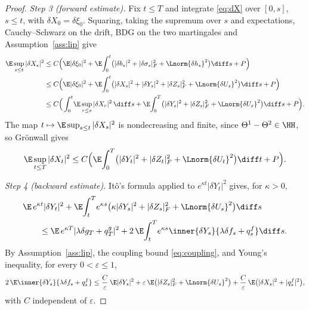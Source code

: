 \begin{proof}
\emph{Step 3 (forward estimate).} Fix $t\le T$ and integrate \eqref{eq:dX} over $[0,s]$,
$s\le t$, with $\delta X_0=\delta\xi_0$. Squaring, taking the supremum over $s$ and
expectations, Cauchy--Schwarz on the drift, BDG on the two martingales and
Assumption~\ref{ass:lip} give
\[
\begin{aligned}
\E\sup_{s\le t}|\delta X_s|^2
&\le C\Big(\E|\delta\xi_0|^2+\E\!\int_0^t\!\big(|\delta b_s|^2+|\delta\sigma_s|_F^2+\Lnorm{\delta h_s}^2\big)\diff s+P\Big)\\
&\le C\Big(\E|\delta\xi_0|^2+\E\!\int_0^t\!\big(|\delta X_s|^2+|\delta Y_s|^2+|\delta Z_s|_F^2+\Lnorm{\delta U_s}^2\big)\diff s+P\Big)\\
&\le C\Big(\int_0^t\!\E\sup_{r\le s}|\delta X_r|^2\,\diff s
+\E\!\int_0^T\!\big(|\delta Y_s|^2+|\delta Z_s|_F^2+\Lnorm{\delta U_s}^2\big)\diff s+P\Big) .
\end{aligned}
\]
The map $t\mapsto\E\sup_{s\le t}|\delta X_s|^2$ is nondecreasing and finite, since
$\Theta^1-\Theta^2\in\HH$, so Gr\"onwall gives
\begin{equation}\label{eq:fwd}
\E\sup_{t\le T}|\delta X_t|^2\le C\Big(\E\!\int_0^T\!\big(|\delta Y_t|^2+|\delta Z_t|_F^2+\Lnorm{\delta U_t}^2\big)\diff t+P\Big).
\end{equation}

\emph{Step 4 (backward estimate).} It\^o's formula applied to $e^{\kappa t}|\delta Y_t|^2$
gives, for $\kappa>0$,
\begin{equation}\label{eq:bwdito}
\begin{aligned}
&\E\,e^{\kappa t}|\delta Y_t|^2
+\E\!\int_t^T\!e^{\kappa s}\big(\kappa|\delta Y_s|^2+|\delta Z_s|_F^2+\Lnorm{\delta U_s}^2\big)\diff s\\
&\qquad\le\E\,e^{\kappa T}|\lambda\delta g_T+q^g_T|^2
+2\,\E\!\int_t^T\!e^{\kappa s}\inner{\delta Y_s}{\lambda\delta f_s+q^f_s}\diff s .
\end{aligned}
\end{equation}
By Assumption~\ref{ass:lip}, the coupling bound \eqref{eq:coupling}, and Young's
inequality, for every $0<\varepsilon\le1$,
\begin{equation}\label{eq:bwdyoung}
2\,\E\inner{\delta Y_s}{\lambda\delta f_s+q^f_s}
\le \frac C\varepsilon\,\E|\delta Y_s|^2+\varepsilon\,\E\big(|\delta Z_s|_F^2+\Lnorm{\delta U_s}^2\big)
+\frac C\varepsilon\,\E\big(|\delta X_s|^2+|q^f_s|^2\big),
\end{equation}
with $C$ independent of $\varepsilon$.


\end{proof}
